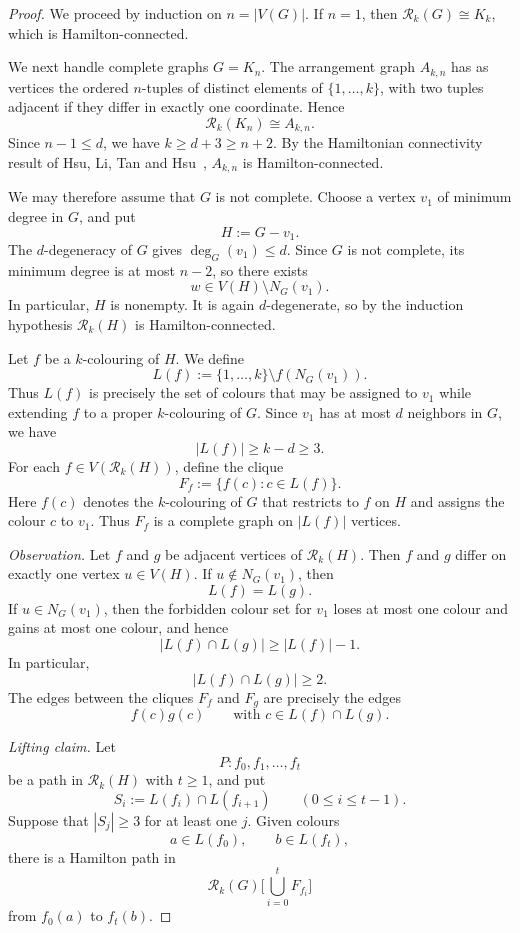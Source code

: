 \documentclass[11pt]{article}
\theoremstyle{remark}
\newcommand{\Rk}{\mathcal R_k}
\numberwithin{equation}{section}
\numberwithin{table}{section}
\begin{document}
\begin{proof}
We proceed by induction on $n=|V(G)|$. If $n=1$, then
$\Rk(G)\cong K_k$, which is Hamilton-connected.

We next handle complete graphs $G=K_n$. The arrangement
graph $A_{k,n}$ has as vertices the ordered $n$-tuples of distinct
elements of $\{1,\ldots,k\}$, with two tuples adjacent if they differ
in exactly one coordinate. Hence
\[
\Rk(K_n)\cong A_{k,n}.
\]
Since $n-1\le d$, we have $k\ge d+3\ge n+2$.
By the Hamiltonian connectivity result of Hsu, Li, Tan and
Hsu~\cite[Theorem~1]{HLTH04}, $A_{k,n}$ is Hamilton-connected.

We may therefore assume that $G$ is not complete. Choose a vertex
$v_1$ of minimum degree in $G$, and put
\[
H:=G-v_1.
\]
The $d$-degeneracy of $G$ gives $\deg_G(v_1)\le d$. Since $G$ is
not complete, its minimum degree is at most $n-2$, so there exists
\[
w\in V(H)\setminus N_G(v_1).
\]
In particular, $H$ is nonempty. It is again $d$-degenerate, so by
the induction hypothesis $\Rk(H)$ is Hamilton-connected.

Let $f$ be a $k$-colouring of $H$. We define
\[
L(f):=\{1,\ldots,k\}\setminus f(N_G(v_1)).
\]
Thus $L(f)$ is precisely the set of colours that may be assigned to $v_1$ while extending $f$ to a proper $k$-colouring of $G$. 
Since $v_1$ has at most $d$ neighbors in $G$, we have
\[
|L(f)|\geq k-d\geq 3.
\]
For each $f\in V(\Rk(H))$, define the clique
\[
F_f:=\{f(c):c\in L(f)\}.
\]
Here $f(c)$ denotes the $k$-colouring of $G$ that restricts to $f$ on $H$ and assigns the colour $c$ to $v_1$. Thus $F_f$ is a complete graph on $|L(f)|$ vertices.

\smallskip

\noindent\textit{Observation.}
Let $f$ and $g$ be adjacent vertices of $\Rk(H)$. Then $f$ and $g$ differ on exactly one vertex $u\in V(H)$. If $u\notin N_G(v_1)$, then
\[
L(f)=L(g).
\]
If $u\in N_G(v_1)$, then the forbidden colour set for $v_1$ loses at
most one colour and gains at most one colour, and hence
\[
|L(f)\cap L(g)|\geq |L(f)|-1.
\]
In particular,
\[
|L(f)\cap L(g)|\geq 2.
\]
The edges between the cliques $F_f$ and $F_g$ are precisely the edges
\[
f(c)g(c)\qquad \text{with } c\in L(f)\cap L(g).
\]

\smallskip

\noindent\textit{Lifting claim.}
Let
\[
P:f_0,f_1,\dots,f_t
\]
be a path in $\Rk(H)$ with $t\ge1$, and put
\[
S_i:=L(f_i)\cap L(f_{i+1})\qquad(0\le i\le t-1).
\]
Suppose that $|S_j|\ge3$ for at least one $j$. Given colours
\[
a\in L(f_0),\qquad b\in L(f_t),
\]
there is a Hamilton path in
\[
\Rk(G)\bigg[\bigcup_{i=0}^t F_{f_i}\bigg]
\]
from $f_0(a)$ to $f_t(b)$.


\end{proof}
\end{document}
